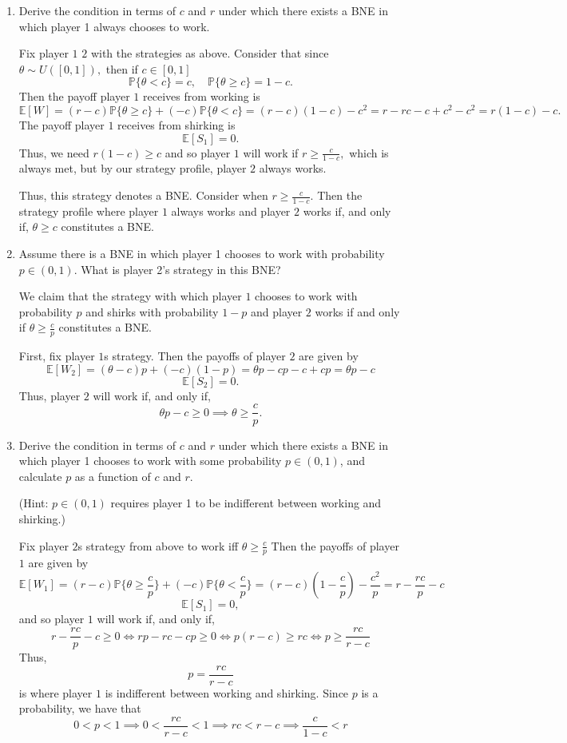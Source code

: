 \documentclass[11pt]{article}
\newcommand{\bbE}{\mathbb{E}}
\newcommand{\bbP}{\mathbb{P}}
\begin{document}
\begin{enumerate}
\begin{solution}
\end{solution}
    \item Derive the condition in terms of \( c \) and \( r \) under which there exists a BNE in which player 1 always chooses to work.
\begin{solution}
Fix player $1$ $2$ with the strategies as above. Consider that since $\theta \sim U([0,1]),$ then if $c\in [0,1]$
\[\bbP\{\theta < c\} = c, \quad \bbP\{\theta \geq c\} = 1-c.\] Then the payoff player $1$ receives from working is
\[\bbE[W] = (r-c)\bbP\{\theta \geq c\} + (-c)\bbP\{\theta < c\} = (r-c)(1-c) -c^2 = r  - rc -c +c^2 - c^2 = r(1-c) - c.\] The payoff player $1$ receives from shirking is
\[\bbE[S_1]= 0.\] Thus, we need $r(1-c) \geq c$ and so player $1$ will work if $\boxed{r\geq \frac{c}{1-c}},$ which is always met, but by our strategy profile, player $2$ always works.

Thus, this strategy denotes a BNE. Consider when $r \geq \frac{c}{1-c}.$ Then the strategy profile where player $1$ always works and player $2$ works if, and only if, $\boxed{\theta \geq c}$ constitutes a BNE.
\end{solution}
    \item Assume there is a BNE in which player 1 chooses to work with probability \( p \in (0,1) \). What is player 2's strategy in this BNE?
\begin{solution}
    We claim that the strategy with which player $1$ chooses to work with probability $p$ and shirks with probability $1-p$ and player $2$ works if and only if $\theta \geq \frac{c}{p}$ constitutes a BNE. 

First, fix player $1$s strategy. Then the payoffs of player $2$ are given by 
\[\bbE[W_2] = (\theta - c)p + (-c)(1-p) = \theta p -cp - c + cp = \theta p -c\]
\[\bbE[S_2] = 0.\]
Thus, player $2$ will work if, and only if, 
\[\theta p -c \geq 0 \implies \boxed{\theta \geq \frac{c}{p}}.\] 


\end{solution}
    \item Derive the condition in terms of \( c \) and \( r \) under which there exists a BNE in which player 1 chooses to work with some probability \( p \in (0,1) \), and calculate \( p \) as a function of \( c \) and \( r \).
    
    (Hint: \( p \in (0,1) \) requires player 1 to be indifferent between working and shirking.)
\begin{solution}
Fix player $2$s strategy from above to work iff $\theta \geq \frac{c}{p}$ Then the payoffs of player $1$ are given by 
\[\bbE[W_1] = (r-c)\bbP\{\theta \geq \frac{c}{p}\} + (-c)\bbP\{\theta < \frac{c}{p}\} = (r-c)(1 - \frac{c}{p}) - \frac{c^2}{p} = r - \frac{rc}{p} - c\]
\[\bbE[S_1] = 0,\] and so player $1$ will work if, and only if, 
\[r - \frac{rc}{p} - c\geq 0 \iff rp - rc - cp \geq 0 \iff p(r-c) \geq rc \iff p \geq \frac{rc}{r-c}\] Thus, 
    \[\boxed{p = \frac{rc}{r-c}}\] is where player $1$ is indifferent between working and shirking. Since $p$ is a probability, we have that 
    \[0 < p < 1 \implies 0 < \frac{rc}{r-c} < 1 \implies rc < r-c \implies \boxed{\frac{c}{1-c} < r}\]
\end{solution}
\end{enumerate}
\end{document}
